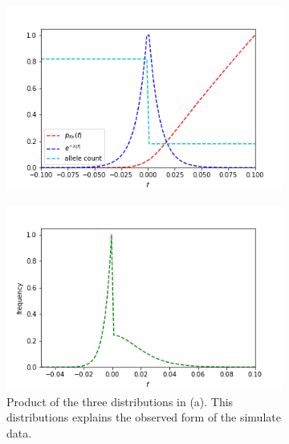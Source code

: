 \documentclass{article}
\begin{document}
\begin{figure}[h]
	\centering
	\begin{subfigure}[t]{0.43\linewidth}
		\centering
		\includegraphics[width = 1.0\linewidth, trim={0 0 0 0}, clip=true]{figures/selection_dists.png}
		\label{fig:alldists}	
	\end{subfigure}
	\hspace{0.1\linewidth}
	\begin{subfigure}[t]{0.43\linewidth}
		\centering
		\includegraphics[width = 1.0\linewidth, trim={0 0 0 0}, clip=true]{figures/all_combined_dists.png}
		\caption{Product of the three distributions in (a). This distributions explains the observed form of the simulate data.}
		\label{fig:comb}
	\end{subfigure}
\caption{}
\label{fig:theory_resample}
\end{figure}
\end{document}
